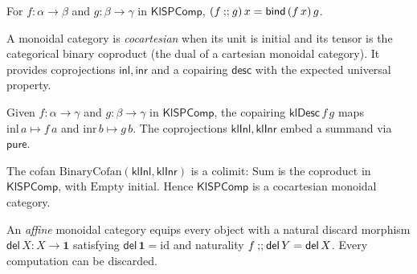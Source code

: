 \begin{lemma}
  \label{lem:klspcomp-comp}
  \leanok
  For $f : \alpha \to \beta$ and $g : \beta \to \gamma$ in $\mathsf{KlSPComp}$,
  $(f \fatsemi g)\,x = \mathsf{bind}\,(f\,x)\,g$.
\end{lemma}

\begin{definition}
  \label{def:cocartesian-class}
  \leanok
  A monoidal category is \emph{cocartesian} when its unit is initial and its
  tensor is the categorical binary coproduct (the dual of a cartesian monoidal
  category). It provides coprojections $\mathsf{inl}, \mathsf{inr}$ and a
  copairing $\mathsf{desc}$ with the expected universal property.
\end{definition}

\begin{definition}
  \label{def:klspcomp-codesc}
  \leanok
  Given $f : \alpha \to \gamma$ and $g : \beta \to \gamma$ in
  $\mathsf{KlSPComp}$, the copairing $\mathsf{klDesc}\,f\,g$ maps
  $\mathrm{inl}\,a \mapsto f\,a$ and $\mathrm{inr}\,b \mapsto g\,b$. The
  coprojections $\mathsf{klInl}, \mathsf{klInr}$ embed a summand via
  $\mathsf{pure}$.
\end{definition}

\begin{proposition}
  \label{prop:klspcomp-cocartesian}
  \leanok
  The cofan $\mathrm{BinaryCofan}(\mathsf{klInl}, \mathsf{klInr})$ is a colimit:
  $\mathrm{Sum}$ is the coproduct in $\mathsf{KlSPComp}$, with $\mathrm{Empty}$
  initial. Hence $\mathsf{KlSPComp}$ is a cocartesian monoidal category.
\end{proposition}

\begin{definition}
  \label{def:affine-class}
  \leanok
  An \emph{affine} monoidal category equips every object with a natural discard
  morphism $\mathsf{del}\,X : X \to \mathbf{1}$ satisfying $\mathsf{del}\,
  \mathbf{1} = \mathrm{id}$ and naturality $f \fatsemi \mathsf{del}\,Y =
  \mathsf{del}\,X$. Every computation can be discarded.
\end{definition}

